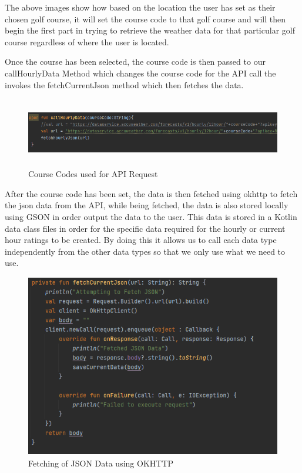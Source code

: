 The above images show how based on the location the user has set as their chosen golf course, it will set the course code to that golf course and will then begin the first part in trying to retrieve the weather data for that particular golf course regardless of where the user is located.

Once the course has been selected, the course code is then passed to our callHourlyData Method which changes the course code for the API call the invokes the fetchCurrentJson method which then fetches the data.

\begin{figure}[H]
    \centering
    \includegraphics[width=16cm,height = 3cm]{img/APICall.PNG}
    \caption{Course Codes used for API Request}
    \label{fig:altas config}
\end{figure}

After the course code has been set, the data is then fetched using okhttp to fetch the json data from the API, while being fetched, the data is also stored locally using GSON in order output the data to the user.
\newline
\newline
This data is stored in a Kotlin data class files in order for the specific data required for the hourly or current hour ratings to be created. By doing this it allows us to call each data type independently from the other data types so that we only use what we need to use.

\begin{figure}[H]
    \centering
    \includegraphics[width=12cm,height = 8cm]{img/DataFetch.PNG}
    \caption{Fetching of JSON Data using OKHTTP}
    \label{fig:altas config}
\end{figure}

